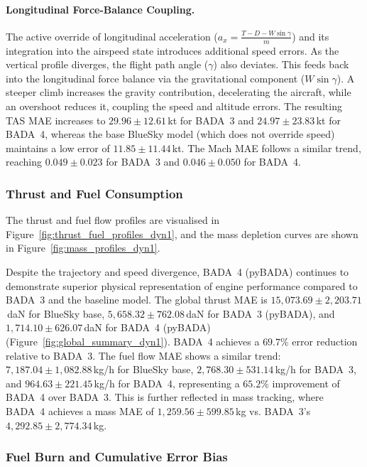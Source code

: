\paragraph{Longitudinal Force-Balance Coupling.}
The active override of longitudinal acceleration ($a_x = \frac{T - D - W \sin \gamma}{m}$) and its integration into the airspeed state introduces additional speed errors. As the vertical profile diverges, the flight path angle ($\gamma$) also deviates. This feeds back into the longitudinal force balance via the gravitational component ($W \sin \gamma$). A steeper climb increases the gravity contribution, decelerating the aircraft, while an overshoot reduces it, coupling the speed and altitude errors. The resulting TAS MAE increases to $29.96 \pm 12.61$\,kt for BADA~3 and $24.97 \pm 23.83$\,kt for BADA~4, whereas the base BlueSky model (which does not override speed) maintains a low error of $11.85 \pm 11.44$\,kt. The Mach MAE follows a similar trend, reaching $0.049 \pm 0.023$ for BADA~3 and $0.046 \pm 0.050$ for BADA~4.

\subsubsection{Thrust and Fuel Consumption}

The thrust and fuel flow profiles are visualised in Figure~\ref{fig:thrust_fuel_profiles_dyn1}, and the mass depletion curves are shown in Figure~\ref{fig:mass_profiles_dyn1}. 

Despite the trajectory and speed divergence, BADA~4 (pyBADA) continues to demonstrate superior physical representation of engine performance compared to BADA~3 and the baseline model. The global thrust MAE is $15{,}073.69 \pm 2{,}203.71$\,daN for BlueSky base, $5{,}658.32 \pm 762.08$\,daN for BADA~3 (pyBADA), and $1{,}714.10 \pm 626.07$\,daN for BADA~4 (pyBADA) (Figure~\ref{fig:global_summary_dyn1}). BADA~4 achieves a $69.7\%$ error reduction relative to BADA~3. The fuel flow MAE shows a similar trend: $7{,}187.04 \pm 1{,}082.88$\,kg/h for BlueSky base, $2{,}768.30 \pm 531.14$\,kg/h for BADA~3, and $964.63 \pm 221.45$\,kg/h for BADA~4, representing a $65.2\%$ improvement of BADA~4 over BADA~3. This is further reflected in mass tracking, where BADA~4 achieves a mass MAE of $1{,}259.56 \pm 599.85$\,kg vs. BADA~3's $4{,}292.85 \pm 2{,}774.34$\,kg.

\subsubsection{Fuel Burn and Cumulative Error Bias}

